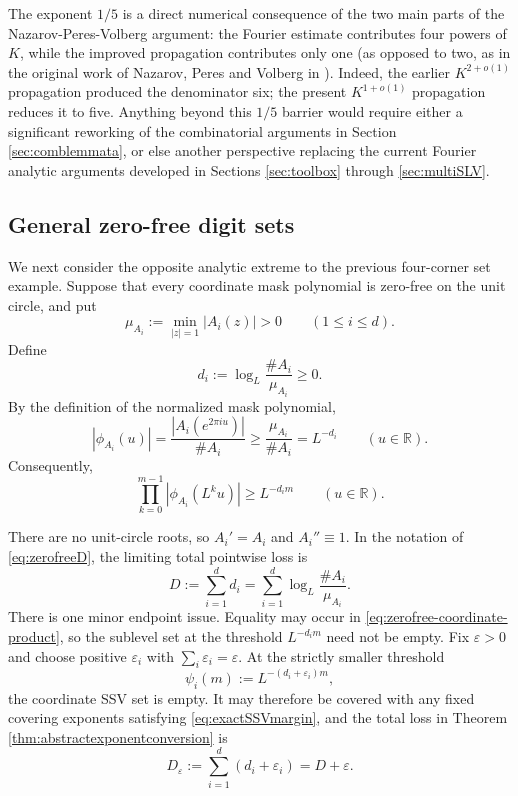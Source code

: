 \documentclass[12pt]{amsart}
\numberwithin{equation}{section}
\begin{document}
The exponent $1/5$ is a direct numerical consequence of the two
main parts of the Nazarov-Peres-Volberg argument: the Fourier estimate contributes four powers of
$K$, while the improved propagation contributes only one (as opposed to two, as in the original work of Nazarov, Peres and Volberg in \cite{NPV}).  Indeed, the earlier
$K^{2+o(1)}$ propagation produced the denominator six; the present
$K^{1+o(1)}$ propagation reduces it to five. Anything beyond this $1/5$ barrier would require either a significant reworking of the combinatorial arguments in Section \ref{sec:comblemmata}, or else another perspective replacing the current Fourier analytic arguments developed in Sections \ref{sec:toolbox} through \ref{sec:multiSLV}.

\subsection{General zero-free digit sets}

We next consider the opposite analytic extreme to the previous four-corner set example.  Suppose that every
coordinate mask polynomial is zero-free on the unit circle, and put
\[
 \mu_{A_i}:=\min_{|z|=1}|A_i(z)|>0
 \qquad(1\leq i\leq d).
\]
Define
\begin{equation}\label{eq:zero-free-coordinate-loss}
 d_i:=\log_L\frac{\#A_i}{\mu_{A_i}}\geq0.
\end{equation}
By the definition of the normalized mask polynomial,
\[
 |\phi_{A_i}(u)|
 =\frac{|A_i(e^{2\pi iu})|}{\#A_i}
 \geq\frac{\mu_{A_i}}{\#A_i}
 =L^{-d_i}
 \qquad(u\in\mathbb R).
\]
Consequently,
\begin{equation}\label{eq:zerofree-coordinate-product}
 \prod_{k=0}^{m-1}|\phi_{A_i}(L^ku)|
 \geq L^{-d_im}
 \qquad(u\in\mathbb R).
\end{equation}

There are no unit-circle roots, so $A_i'=A_i$ and $A_i''\equiv1$.  In the
notation of \eqref{eq:zerofreeD}, the limiting total pointwise loss is
\begin{equation}\label{eq:zero-free-total-loss}
 D:=\sum_{i=1}^dd_i
 =\sum_{i=1}^d\log_L\frac{\#A_i}{\mu_{A_i}}.
\end{equation}
There is one minor endpoint issue.  Equality may occur in
\eqref{eq:zerofree-coordinate-product}, so the sublevel set at the threshold
$L^{-d_im}$ need not be empty.  Fix $\varepsilon>0$ and choose positive
$\varepsilon_i$ with $\sum_i\varepsilon_i=\varepsilon$.  At the strictly
smaller threshold
\[
 \psi_i(m):=L^{-(d_i+\varepsilon_i)m},
\]
the coordinate SSV set is empty.  It may therefore be covered with any fixed
covering exponents satisfying \eqref{eq:exactSSVmargin}, and the total loss in
Theorem \ref{thm:abstractexponentconversion} is
\[
 D_\varepsilon
 :=\sum_{i=1}^d(d_i+\varepsilon_i)
 =D+\varepsilon.
\]
\end{document}
